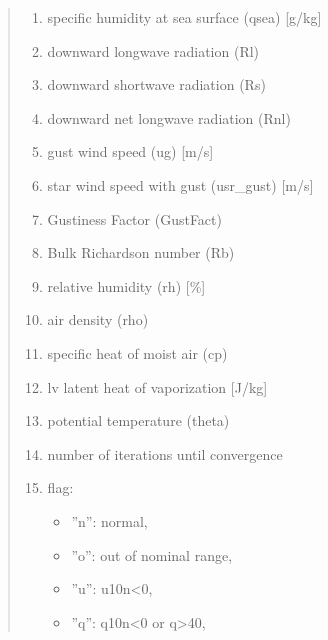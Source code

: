 \documentclass[letterpaper,10pt,english]{sphinxmanual}
\begin{document}
\begin{fulllineitems}
\begin{quote}
\begin{description}
\begin{enumerate}
\item {}
\sphinxAtStartPar
specific humidity at sea surface (qsea) {[}g/kg{]}

\item {}
\sphinxAtStartPar
downward longwave radiation (Rl)

\item {}
\sphinxAtStartPar
downward shortwave radiation (Rs)

\item {}
\sphinxAtStartPar
downward net longwave radiation (Rnl)

\item {}
\sphinxAtStartPar
gust wind speed (ug) {[}m/s{]}

\item {}
\sphinxAtStartPar
star wind speed with gust (usr\_gust) {[}m/s{]}

\item {}
\sphinxAtStartPar
Gustiness Factor (GustFact)

\item {}
\sphinxAtStartPar
Bulk Richardson number (Rb)

\item {}
\sphinxAtStartPar
relative humidity (rh) {[}\%{]}

\item {}
\sphinxAtStartPar
air density (rho)

\item {}
\sphinxAtStartPar
specific heat of moist air (cp)

\item {}
\sphinxAtStartPar
lv latent heat of vaporization {[}J/kg{]}

\item {}
\sphinxAtStartPar
potential temperature (theta)

\item {}
\sphinxAtStartPar
number of iterations until convergence

\item {}
\sphinxAtStartPar
flag:
\begin{itemize}
\item {}
\sphinxAtStartPar
”n”: normal,

\item {}
\sphinxAtStartPar
”o”: out of nominal range,

\item {}
\sphinxAtStartPar
”u”: u10n\textless{}0,

\item {}
\sphinxAtStartPar
”q”: q10n\textless{}0 or q\textgreater{}40,


\end{itemize}
\end{enumerate}
\end{description}
\end{quote}
\end{fulllineitems}
\end{document}
